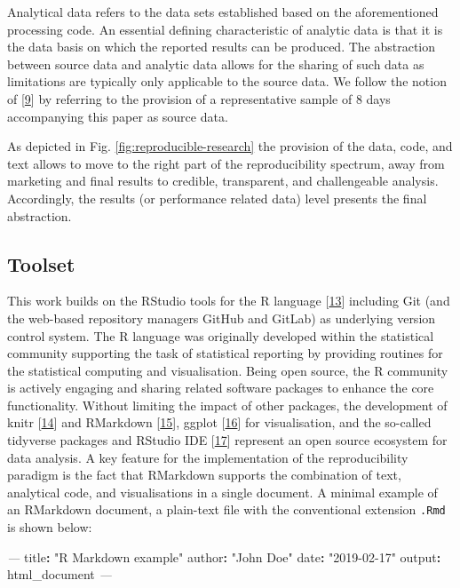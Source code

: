 \documentclass[conference,final,a4paper,]{IEEEtran}
\newenvironment{Shaded}{\begin{snugshade}}{\end{snugshade}}
\newcommand{\AttributeTok}[1]{\textcolor[rgb]{0.77,0.63,0.00}{#1}}
\newcommand{\FunctionTok}[1]{\textcolor[rgb]{0.00,0.00,0.00}{#1}}
\newcommand{\KeywordTok}[1]{\textcolor[rgb]{0.13,0.29,0.53}{\textbf{#1}}}
\newcommand{\PreprocessorTok}[1]{\textcolor[rgb]{0.56,0.35,0.01}{\textit{#1}}}
\newcommand{\StringTok}[1]{\textcolor[rgb]{0.31,0.60,0.02}{#1}}
\begin{document}
Analytical data refers to the data sets established based on the aforementioned processing code.
An essential defining characteristic of analytic data is that it is the data basis on which the reported results can be produced.
The abstraction between source data and analytic data allows for the sharing of such data as limitations are typically only applicable to the source data. We follow the notion of {[}\protect\hyperlink{ref-marwick_2017}{9}{]} by referring to the provision of a representative sample of 8 days accompanying this paper as source data.

As depicted in Fig. \ref{fig:reproducible-research} the provision of the data, code, and text allows to move to the right part of the reproducibility spectrum, away from marketing and final results to credible, transparent, and challengeable analysis.
Accordingly, the results (or performance related data) level presents the final abstraction.

\hypertarget{toolset}{%
\subsection{Toolset}\label{toolset}}

This work builds on the RStudio tools for the R language {[}\protect\hyperlink{ref-rcoreteam_2018}{13}{]} including Git (and the web-based repository managers GitHub and GitLab) as underlying version control system.
The R language was originally developed within the statistical community supporting the task of statistical reporting by providing routines for the statistical computing and visualisation.
Being open source, the R community is actively engaging and sharing related software packages to enhance the core functionality.
Without limiting the impact of other packages, the development of knitr {[}\protect\hyperlink{ref-R-knitr}{14}{]} and RMarkdown {[}\protect\hyperlink{ref-xie2018}{15}{]}, ggplot {[}\protect\hyperlink{ref-wickham_2016}{16}{]} for visualisation, and the so-called tidyverse packages and RStudio IDE {[}\protect\hyperlink{ref-rstudioteam_2015}{17}{]} represent an open source ecosystem for data analysis.
A key feature for the implementation of the reproducibility paradigm is the fact that RMarkdown supports the combination of text, analytical code, and visualisations in a single document.
A minimal example of an RMarkdown document, a plain-text file with the conventional
extension \texttt{.Rmd} is shown below:

\footnotesize

\begin{Shaded}
\begin{Highlighting}[]
\PreprocessorTok{---}
\FunctionTok{title}\KeywordTok{:}\AttributeTok{ }\StringTok{"R Markdown example"}
\FunctionTok{author}\KeywordTok{:}\AttributeTok{ }\StringTok{"John Doe"}
\FunctionTok{date}\KeywordTok{:}\AttributeTok{ }\StringTok{"2019-02-17"}
\FunctionTok{output}\KeywordTok{:}\AttributeTok{ html_document}
\PreprocessorTok{---}
\end{Highlighting}
\end{Shaded}
\end{document}
